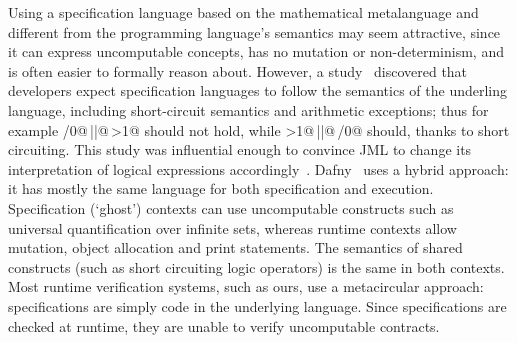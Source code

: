 


Using a specification language based on the mathematical metalanguage and different from the programming language's semantics may seem attractive, since it can express uncomputable concepts, has no mutation or non-determinism, and is often easier to formally reason about.
However, a study~\cite{chalin2007logical} discovered that developers expect specification languages to follow the semantics of the underling language, including short-circuit semantics and arithmetic exceptions; thus for example /0@\,\Q@||@\,>1@ should not hold, while >1@\,\Q@||@\,/0@ should, thanks to short circuiting.
This study was influential enough to convince JML to change its interpretation of logical expressions
accordingly~\cite{chalin2008jml}.
Dafny~\cite{DBLP:conf/sigada/Leino12} uses a hybrid approach: it has mostly the same language for both specification and execution. Specification (`ghost') contexts can use uncomputable constructs such as universal quantification over infinite sets, whereas runtime contexts allow mutation, object allocation and print statements. The semantics of shared constructs (such as short circuiting logic operators) is the same in both contexts.
Most runtime verification systems, such as ours, use a metacircular approach: specifications are simply code in the underlying language. Since specifications are checked at runtime, they are unable to verify uncomputable contracts.

